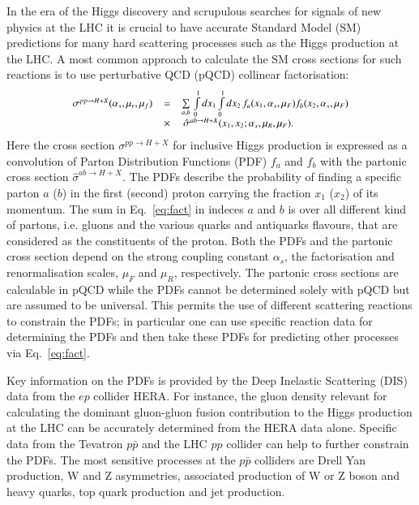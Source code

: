 In the era of the Higgs discovery and scrupulous searches
for signals of new physics at the LHC it is crucial
to have accurate Standard Model (SM) predictions for
many hard scattering processes such as the Higgs production at the LHC.
A most common approach to calculate the SM cross sections for  
such reactions is to use perturbative QCD (pQCD) collinear factorisation:
\begin{equation}
\small
\begin{array}{lcl}
\sigma^{pp\rightarrow H + X}(\alpha_s,\mu_r,\mu_f) & = &
\sum\limits_{a,b}\,  \int\limits_{0}\limits^{1} dx_1 \int\limits_{0}\limits^{1} dx_2\, f_a(x_1,\alpha_s,\mu_F) 
 f_b(x_2,\alpha_s,\mu_F)\\ 
& \times & \, \hat{\sigma}^{ab \rightarrow H + X}(x_1,x_2;\alpha_s,\mu_R,\mu_F).
\label{eq:fact}
\end{array}
\end{equation}
Here the cross section $\sigma^{pp\rightarrow H + X}$ for inclusive
Higgs production is expressed
as a convolution of Parton Distribution Functions (PDF) $f_a$ and $f_b$
with the partonic cross section
$\hat{\sigma}^{ab \rightarrow H + X}$.
%
The PDFs describe 
the probability of finding a specific parton $a$ ($b$) in the first (second) proton carrying the fraction $x_1$ ($x_2$) of its momentum.
%
The sum in Eq.~\ref{eq:fact} in indeces $a$ and $b$ is over all different kind of partons,
i.e. gluons and the various quarks and antiquarks flavours, that are considered
as the constituents of the proton.
%
Both the PDFs and the partonic cross section depend on the strong coupling
constant $\alpha_s$, the factorisation and renormalisation scales,
$\mu_F$ and $\mu_R$, respectively.
%
The partonic cross sections are calculable in pQCD while
the PDFs cannot be determined solely with pQCD but are assumed 
to be universal.
%
This permits the use of different scattering reactions 
to constrain the PDFs; in particular one can use specific reaction data 
for determining the PDFs and then take these PDFs for
predicting other processes via Eq.~\ref{eq:fact}.
%

Key information on the PDFs is provided by the Deep Inelastic Scattering (DIS) data from the $ep$ collider HERA.
%
For instance, the gluon density relevant
for calculating the dominant gluon-gluon fusion contribution to the Higgs production
at the LHC can be accurately determined from the HERA data alone.
%
Specific data from the Tevatron $p\bar{p}$ and the LHC $pp$ collider
can help to further constrain the PDFs.
%
The most sensitive processes at the  $p\bar{p}$ colliders are
Drell Yan production, W and Z asymmetries, associated production of W or Z boson 
and heavy quarks, top quark production and jet production.
%

